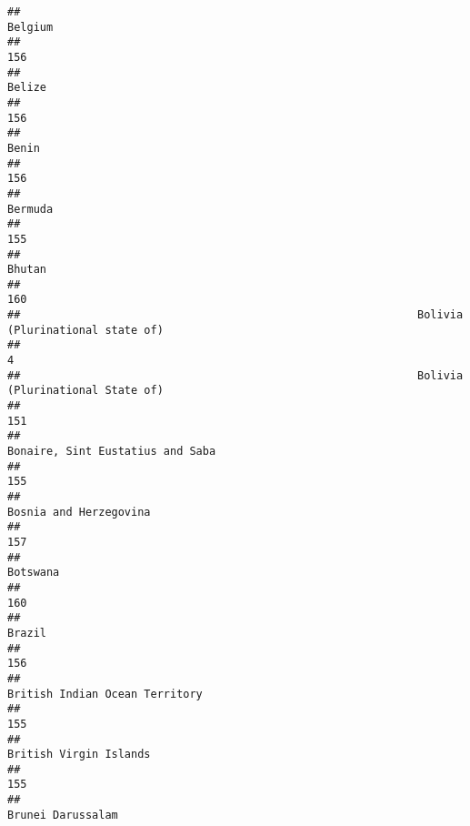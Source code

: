 \documentclass[]{article}
\begin{document}
\begin{verbatim}
##                                                                                      Belgium 
##                                                                                          156 
##                                                                                       Belize 
##                                                                                          156 
##                                                                                        Benin 
##                                                                                          156 
##                                                                                      Bermuda 
##                                                                                          155 
##                                                                                       Bhutan 
##                                                                                          160 
##                                                             Bolivia (Plurinational state of) 
##                                                                                            4 
##                                                             Bolivia (Plurinational State of) 
##                                                                                          151 
##                                                             Bonaire, Sint Eustatius and Saba 
##                                                                                          155 
##                                                                       Bosnia and Herzegovina 
##                                                                                          157 
##                                                                                     Botswana 
##                                                                                          160 
##                                                                                       Brazil 
##                                                                                          156 
##                                                               British Indian Ocean Territory 
##                                                                                          155 
##                                                                       British Virgin Islands 
##                                                                                          155 
##                                                                            Brunei Darussalam 

\end{verbatim}
\end{document}
